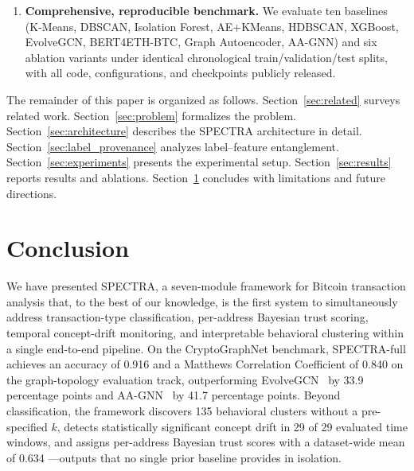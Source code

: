 \begin{enumerate}[leftmargin=*, label=\textbf{C\arabic*}]
  \item \textbf{Comprehensive, reproducible benchmark.}
    We evaluate ten baselines (K-Means, DBSCAN, Isolation Forest,
    AE+KMeans, HDBSCAN, XGBoost, EvolveGCN, BERT4ETH-BTC, Graph
    Autoencoder, AA-GNN) and six ablation variants under identical
    chronological train/validation/test splits, with all code, configurations,
    and checkpoints publicly released.

\end{enumerate}

The remainder of this paper is organized as follows.
Section~\ref{sec:related} surveys related work.
Section~\ref{sec:problem} formalizes the problem.
Section~\ref{sec:architecture} describes the SPECTRA architecture in detail.
Section~\ref{sec:label_provenance} analyzes label--feature entanglement.
Section~\ref{sec:experiments} presents the experimental setup.
Section~\ref{sec:results} reports results and ablations.
Section~\ref{sec:conclusion} concludes with limitations and future directions.



\section{Conclusion}
\label{sec:conclusion}

We have presented \textsc{SPECTRA}, a seven-module framework for Bitcoin
transaction analysis that, to the best of our knowledge, is the first system
to simultaneously address transaction-type classification, per-address
Bayesian trust scoring, temporal concept-drift monitoring, and interpretable
behavioral clustering within a single end-to-end pipeline.
On the CryptoGraphNet benchmark, SPECTRA-full achieves an accuracy of
\num{0.916} and a Matthews Correlation Coefficient of \num{0.840} on the
graph-topology evaluation track, outperforming EvolveGCN~\cite{Pareja2020}
by \num{33.9} percentage points and AA-GNN~\cite{Zhou2020} by
\num{41.7} percentage points.
Beyond classification, the framework discovers \num{135} behavioral
clusters without a pre-specified $k$, detects statistically significant
concept drift in \num{29} of \num{29} evaluated time windows, and assigns
per-address Bayesian trust scores with a dataset-wide mean of \num{0.634}
---outputs that no single prior baseline provides in isolation.

